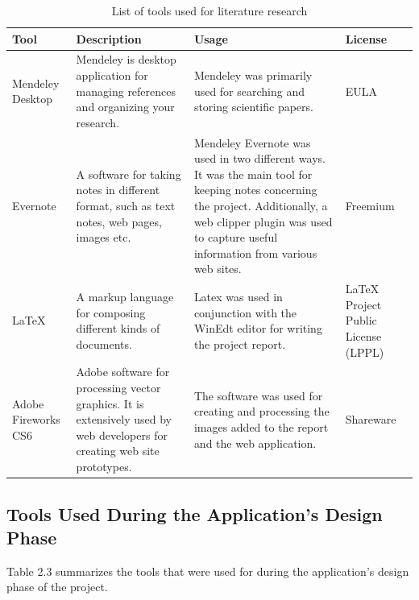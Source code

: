 \begin{table}
  \centering
  \begin{tabular}{|p{100px}|p{100px}|p{100px}|p{100px}|}
    \hline
    Tool  & Description & Usage & License \\
    \hline
    Mendeley Desktop & Mendeley is desktop application for managing references and organizing your research.& Mendeley was primarily used for searching and storing scientific papers. & EULA \\ \hline

    Evernote & A software for taking notes in different format, such as text notes, web pages, images etc. & Mendeley Evernote was used in two different ways. It was the main tool for keeping notes concerning the project. Additionally, a web clipper plugin was used to capture useful information from various web sites. & Freemium \\ \hline

    LaTeX & A markup language for composing different kinds of documents. & Latex was used in conjunction with the WinEdt editor for writing the project report. & LaTeX Project Public License (LPPL) \\ \hline

    Adobe Fireworks CS6 & Adobe software for processing vector graphics. It is extensively used by web developers for creating web site prototypes.  & The software was used for creating and processing the images added to the report and the web application. & Shareware \\ \hline

    \hline
  \end{tabular}
  \caption{List of tools used for literature research}\label{literatureTools}
\end{table}


\subsection{Tools Used During the Application's Design Phase}

Table 2.3 summarizes the tools that were used for during the application's design phase of the project.


